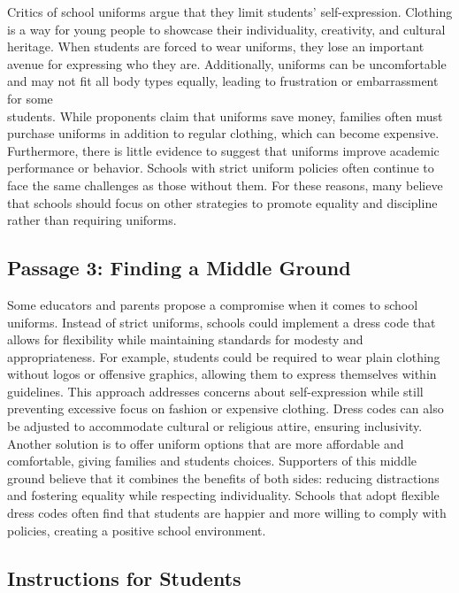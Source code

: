 \documentclass[12pt]{article}
\begin{document}
Critics of school uniforms argue that they limit students’ self-expression. Clothing is a way for young people to showcase their individuality, creativity, and cultural heritage. When students are forced to wear uniforms, they lose an important avenue for expressing who they are. Additionally, uniforms can be uncomfortable and may not fit all body types equally, leading to frustration or embarrassment for some\\ students. While proponents claim that uniforms save money, families often must purchase uniforms in addition to regular clothing, which can become expensive. Furthermore, there is little evidence to suggest that uniforms improve academic performance or behavior. Schools with strict uniform policies often continue to face the same challenges as those without them. For these reasons, many believe that schools should focus on other strategies to promote equality and discipline rather than requiring uniforms.

\subsection*{Passage 3: Finding a Middle Ground}

Some educators and parents propose a compromise when it comes to school uniforms. Instead of strict uniforms, schools could implement a dress code that allows for flexibility while maintaining standards for modesty and appropriateness. For example, students could be required to wear plain clothing without logos or offensive graphics, allowing them to express themselves within guidelines. This approach addresses concerns about self-expression while still preventing excessive focus on fashion or expensive clothing. Dress codes can also be adjusted to accommodate cultural or religious attire, ensuring inclusivity. Another solution is to offer uniform options that are more affordable and comfortable, giving families and students choices. Supporters of this middle ground believe that it combines the benefits of both sides: reducing distractions and fostering equality while respecting individuality. Schools that adopt flexible dress codes often find that students are happier and more willing to comply with policies, creating a positive school environment.
\newpage
\subsection*{Instructions for Students}
\end{document}
